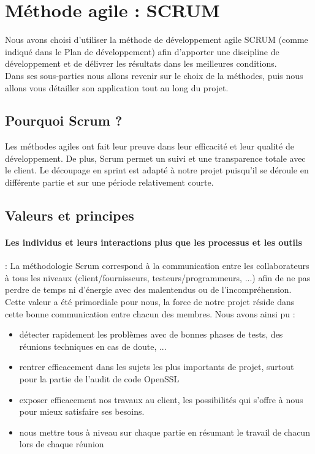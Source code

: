 \section{Méthode agile : SCRUM}

Nous avons choisi d'utiliser la méthode de développement agile SCRUM (comme indiqué dans le Plan de développement) afin d’apporter une discipline de développement et de délivrer les résultats dans les meilleures conditions.\\
Dans ses sous-parties nous allons revenir sur le choix de la méthodes, puis nous allons vous détailler son application tout au long du projet.

\subsection{Pourquoi Scrum ?}

Les méthodes agiles ont fait leur preuve dans leur efficacité et leur qualité de développement. De plus, Scrum permet un suivi et une transparence totale avec le client. Le découpage en sprint est adapté à notre projet puisqu’il se déroule en différente partie et sur une période relativement courte.

\subsection{Valeurs et principes}

\paragraph{Les individus et leurs interactions plus que les processus et les outils} : La méthodologie Scrum correspond à la communication entre les collaborateurs à tous les niveaux (client/fournisseurs, testeurs/programmeurs, ...) afin de ne pas perdre de temps ni d’énergie avec des malentendus ou de l’incompréhension.\\

Cette valeur a été primordiale pour nous, la force de notre projet réside dans cette bonne communication entre chacun des membres.
Nous avons ainsi pu :
\begin{itemize}
\item détecter rapidement les problèmes avec de bonnes phases de tests, des réunions techniques en cas de doute, ...
\item rentrer efficacement dans les sujets les plus importants de projet, surtout pour la partie de l'audit de code OpenSSL
\item exposer efficacement nos travaux au client, les possibilités qui s'offre à nous pour mieux satisfaire ses besoins.
\item nous mettre tous à niveau sur chaque partie en résumant le travail de chacun lors de chaque réunion
\end{itemize}


